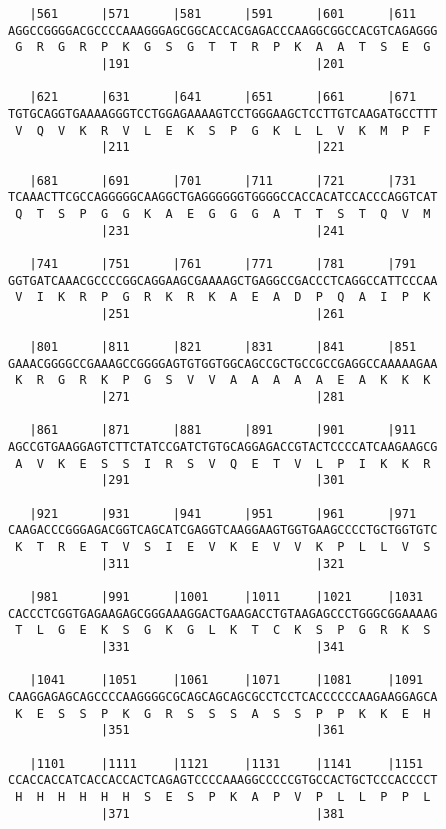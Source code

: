 \documentclass{article}
\begin{document}
\begin{Verbatim}
   |561      |571      |581      |591      |601      |611   
AGGCCGGGGACGCCCCAAAGGGAGCGGCACCACGAGACCCAAGGCGGCCACGTCAGAGGG
 G  R  G  R  P  K  G  S  G  T  T  R  P  K  A  A  T  S  E  G 
             |191                          |201             
  
   |621      |631      |641      |651      |661      |671   
TGTGCAGGTGAAAAGGGTCCTGGAGAAAAGTCCTGGGAAGCTCCTTGTCAAGATGCCTTT
 V  Q  V  K  R  V  L  E  K  S  P  G  K  L  L  V  K  M  P  F 
             |211                          |221             
  
   |681      |691      |701      |711      |721      |731   
TCAAACTTCGCCAGGGGGCAAGGCTGAGGGGGGTGGGGCCACCACATCCACCCAGGTCAT
 Q  T  S  P  G  G  K  A  E  G  G  G  A  T  T  S  T  Q  V  M 
             |231                          |241             
  
   |741      |751      |761      |771      |781      |791   
GGTGATCAAACGCCCCGGCAGGAAGCGAAAAGCTGAGGCCGACCCTCAGGCCATTCCCAA
 V  I  K  R  P  G  R  K  R  K  A  E  A  D  P  Q  A  I  P  K 
             |251                          |261             
  
   |801      |811      |821      |831      |841      |851   
GAAACGGGGCCGAAAGCCGGGGAGTGTGGTGGCAGCCGCTGCCGCCGAGGCCAAAAAGAA
 K  R  G  R  K  P  G  S  V  V  A  A  A  A  A  E  A  K  K  K 
             |271                          |281             
  
   |861      |871      |881      |891      |901      |911   
AGCCGTGAAGGAGTCTTCTATCCGATCTGTGCAGGAGACCGTACTCCCCATCAAGAAGCG
 A  V  K  E  S  S  I  R  S  V  Q  E  T  V  L  P  I  K  K  R 
             |291                          |301             
  
   |921      |931      |941      |951      |961      |971   
CAAGACCCGGGAGACGGTCAGCATCGAGGTCAAGGAAGTGGTGAAGCCCCTGCTGGTGTC
 K  T  R  E  T  V  S  I  E  V  K  E  V  V  K  P  L  L  V  S 
             |311                          |321             
  
   |981      |991      |1001     |1011     |1021     |1031  
CACCCTCGGTGAGAAGAGCGGGAAAGGACTGAAGACCTGTAAGAGCCCTGGGCGGAAAAG
 T  L  G  E  K  S  G  K  G  L  K  T  C  K  S  P  G  R  K  S 
             |331                          |341             
  
   |1041     |1051     |1061     |1071     |1081     |1091  
CAAGGAGAGCAGCCCCAAGGGGCGCAGCAGCAGCGCCTCCTCACCCCCCAAGAAGGAGCA
 K  E  S  S  P  K  G  R  S  S  S  A  S  S  P  P  K  K  E  H 
             |351                          |361             
  
   |1101     |1111     |1121     |1131     |1141     |1151  
CCACCACCATCACCACCACTCAGAGTCCCCAAAGGCCCCCGTGCCACTGCTCCCACCCCT
 H  H  H  H  H  H  S  E  S  P  K  A  P  V  P  L  L  P  P  L 
             |371                          |381             
  

\end{Verbatim}
\end{document}
